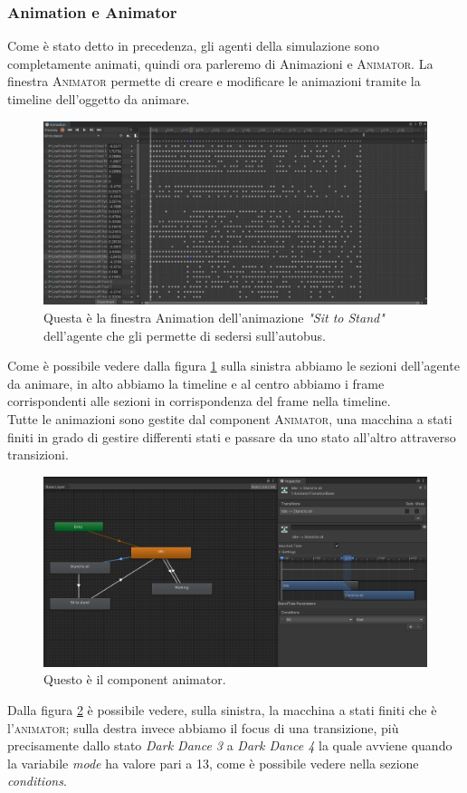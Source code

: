 \documentclass[12pt, openany]{book}
\begin{document}
	\subsubsection{Animation e Animator}
		Come è stato detto in precedenza, gli agenti della simulazione sono completamente animati, quindi ora parleremo di Animazioni e \textsc{Animator}. La finestra \textsc{Animator} permette di creare e modificare le animazioni tramite la timeline dell'oggetto da animare. 
		\begin{figure}[H]
			\centering
			\includegraphics[width=0.8\linewidth]{"Immagini/Animation"}
			\caption{Questa è la finestra Animation dell'animazione \emph{"Sit to Stand"} dell'agente che gli permette di sedersi sull'autobus.}
			\label{fig:Animation}
		\end{figure}
		Come è possibile vedere dalla figura \ref{fig:Animation} sulla sinistra abbiamo le sezioni dell'agente da animare, in alto abbiamo la timeline e al centro abbiamo i frame corrispondenti alle sezioni in corrispondenza del frame nella timeline.\\
		Tutte le animazioni sono gestite dal component \textsc{Animator}, una macchina a stati finiti in grado di gestire differenti stati e passare da uno stato all'altro attraverso transizioni. 
		\begin{figure}[H]
			\centering
			\includegraphics[width=0.8\linewidth]{"Immagini/Animator"}
			\caption{Questo è il component animator.}
			\label{fig:Animator}
		\end{figure}
		Dalla figura \ref{fig:Animator} è possibile vedere, sulla sinistra, la macchina a stati finiti che è l'\textsc{animator}; sulla destra invece abbiamo il focus di una transizione, più precisamente dallo stato  \emph{Dark Dance 3} a \emph{Dark Dance 4} la quale avviene quando la variabile \emph{mode} ha valore pari a 13, come è possibile vedere nella sezione \emph{conditions}.
\end{document}
